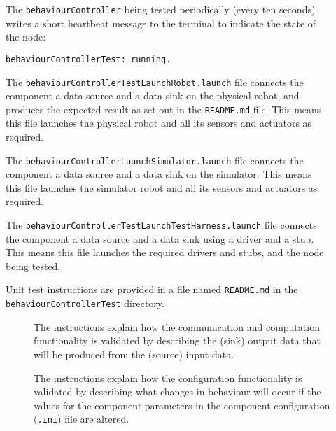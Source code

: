\documentclass{CSSRforAfrica}
\newcommand{\checkboxChecked}{\fbox{\ding{51}}} %
\newcommand{\checkboxDashed}{\fbox{--}}         %
\begin{document}
\begin{description}
\item[\checkboxDashed]  The {\small \verb+behaviourController+} being tested periodically (every ten seconds) writes a short heartbeat message to
 the terminal to indicate the state of the node:
\begin{verbatim}
behaviourControllerTest: running.
\end{verbatim}

\item[\checkboxChecked] The {\small \verb+behaviourControllerTestLaunchRobot.launch+} file  connects the component a data source and a data sink on the physical robot, and produces the expected result as set out in the  {\small \verb+README.md+}  file.    This means this file launches the physical robot and all its sensors and actuators as required.

\item[\checkboxDashed] The {\small \verb+behaviourControllerLaunchSimulator.launch+} file  connects the component a data source and a data sink on the simulator.   This means this file launches the simulator robot and all its sensors and actuators as required.

\item[\checkboxChecked] The {\small \verb+behaviourControllerTestLaunchTestHarness.launch+} file  connects the component a data source and a data sink using a driver and a stub.   This means this file launches the required drivers and stubs, and the node being tested.

\item[\checkboxChecked] Unit test instructions are provided in a file named {\small \verb+README.md+} in the  {\small \verb+behaviourControllerTest+} directory. 


\begin{description}

\item[\checkboxChecked] The instructions explain how the communication and computation functionality is validated by describing the (sink) output data that will be produced from the (source) input data.  

\item[\checkboxChecked] The instructions explain how the configuration functionality is validated by describing what changes in behaviour will occur if the values for the component parameters in the component configuration ({\small \verb+.ini+}) file are altered.

\end{description}

\end{description} 
\end{document}
